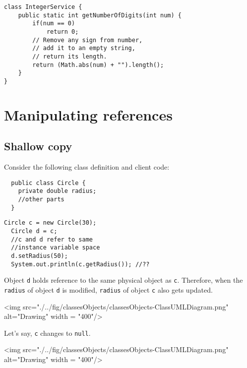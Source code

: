 \begin{lstlisting}[basicstyle=\footnotesize]
class IntegerService {
	public static int getNumberOfDigits(int num) {
		if(num == 0)
			return 0;
		// Remove any sign from number, 
		// add it to an empty string, 
		// return its length.
		return (Math.abs(num) + "").length();
	}
}
\end{lstlisting}

\section{Manipulating references}

\subsection{Shallow copy}
  Consider the following class definition and client code:
  
  \begin{lstlisting}
  public class Circle {
  	private double radius;
  	//other parts
  }
  \end{lstlisting}    
  
  \begin{lstlisting}[style=correct,basicstyle=\footnotesize]
  Circle c = new Circle(30);
  Circle d = c; 
  //c and d refer to same
  //instance variable space
  d.setRadius(50);
  System.out.println(c.getRadius()); //??
  \end{lstlisting}    

  Object \texttt{d} holds reference to the same physical object as \texttt{c}. Therefore, when the \texttt{radius} of object \texttt{d} is modified, \texttt{radius} of object \texttt{c} also gets updated.


\begin{center}
<img src="./../fig/classesObjects/classesObjects-ClassUMLDiagram.png" alt="Drawing" width = "400"/>
\end{center}

Let's say, \texttt{c} changes to \texttt{null}.

\begin{center}
<img src="./../fig/classesObjects/classesObjects-ClassUMLDiagram.png" alt="Drawing" width = "400"/>
\end{center}
  
